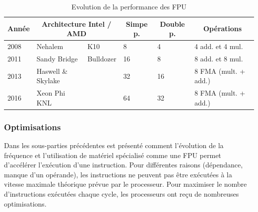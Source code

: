 \begin{table}[]
\centering
\caption{Evolution de la performance des FPU}
\label{my-label}
\begin{tabular}{|l|l|l|l|l|l|}
\hline
\multicolumn{1}{|c|}{\textbf{Année}} & \multicolumn{2}{c|}{\textbf{Architecture Intel / AMD}}     & \multicolumn{1}{c|}{\textbf{Simpe p.}} & \multicolumn{1}{c|}{\textbf{Double p.}} & \multicolumn{1}{c|}{\textbf{Opérations}} \\ \hline
2008                                 & Nehalem                          & K10                     & 8                                      & 4                                       & 4 add. et 4 mul.         \\ \hline
2011                                 & Sandy Bridge                     & Bulldozer               & 16                                     & 8                                       & 8 add. et 8 mul.         \\ \hline
2013                                 & Haswell \& Skylake               &                         & 32                                     & 16                                      & 8 FMA (mult. + add.)        \\ \hline
2016                                 & Xeon Phi KNL &                         & 64                                     & 32                                      & 8 FMA (mult. + add.)        \\ \hline
\end{tabular}
\label{tab_FPU}
\end{table}








\subsubsection{Optimisations}
Dans les sous-parties précédentes est présenté comment l'évolution de la fréquence et l'utilisation de matériel spécialisé comme une FPU permet d'accélérer l'exécution d'une instruction. Pour différentes raisons (dépendance, manque d'un opérande), les instructions ne peuvent pas être exécutées à la vitesse maximale théorique prévue par le processeur. Pour maximiser le nombre d'instructions exécutées chaque cycle, les processeurs ont reçu de nombreuses optimisations. 

